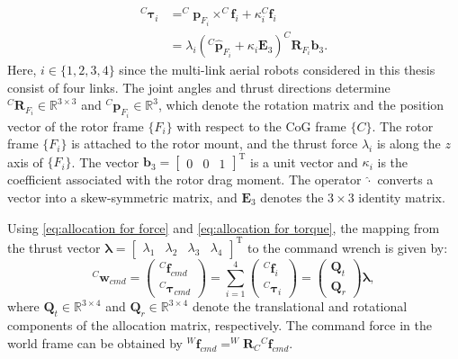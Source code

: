 \begin{equation}
\begin{aligned}
\label{eq:allocation for torque}
    {^C\!\boldsymbol{\tau}_i}&=^C\!\!\boldsymbol{p}_{F_i}\times^C\!\!\boldsymbol{f}_i+\kappa_i ^C\!\boldsymbol{f}_i\\
    &=\lambda_i(^{C}\boldsymbol{\hat{p}}_{F_i}+\kappa_i\boldsymbol{E}_3)^C\boldsymbol{R}_{F_i}\boldsymbol{b}_3.
\end{aligned}
\end{equation}
Here, $i\in\{1,2,3,4\}$ since the multi-link aerial robots considered in this thesis consist of four links. The joint angles and thrust directions determine $^{C}\boldsymbol{R}_{F_i}\in \mathbb{R}^{3\times3}$ and $^{C}\boldsymbol{p}_{F_i}\in \mathbb{R}^3$, which denote the rotation matrix and the position vector of the rotor frame $\{F_i\}$ with respect to the CoG frame $\{C\}$. The rotor frame $\{F_i\}$ is attached to the rotor mount, and the thrust force $\lambda_i$ is along the $z$ axis of $\{F_i\}$. The vector $\boldsymbol{b}_3 = \begin{bmatrix}0 & 0 & 1\end{bmatrix}^{\mathrm{T}}$ is a unit vector and $\kappa_i$ is the coefficient associated with the rotor drag moment. The operator $\hat{\cdot}$ converts a vector into a skew-symmetric matrix, and $\boldsymbol{E}_3$ denotes the $3 \times 3$ identity matrix. 

Using \eqref{eq:allocation for force} and \eqref{eq:allocation for torque}, the mapping from the thrust vector $\boldsymbol{\lambda} = \begin{bmatrix}\lambda_1 & \lambda_2 & \lambda_3&\lambda_4\end{bmatrix}^{\mathrm{T}}$ to the command wrench is given by:
\begin{equation}
\label{eq:allocation for wrench}
^C\!\boldsymbol{w}_{cmd}
=
\begin{pmatrix}
^C\!\boldsymbol{f}_{cmd} \\
^C\!\boldsymbol{\tau}_{cmd}
\end{pmatrix}
=
\sum_{i=1}^{4}
\begin{pmatrix}
^C\!\boldsymbol{f}_i \\
^C\!\boldsymbol{\tau}_i
\end{pmatrix} 
=\begin{pmatrix}
\boldsymbol{Q}_t \\
\boldsymbol{Q}_r
\end{pmatrix}\boldsymbol{\lambda},
\end{equation}
where $\boldsymbol{Q}_t \in \mathbb{R}^{3\times4}$ and $\boldsymbol{Q}_r\in \mathbb{R}^{3\times4}$ denote the translational and rotational components of the allocation matrix, respectively. The command force in the world frame can be obtained by $^W\!\boldsymbol{f}_{cmd} = ^W\!\!\!\boldsymbol{R}_C{}^C\!\boldsymbol{f}_{cmd}$.

